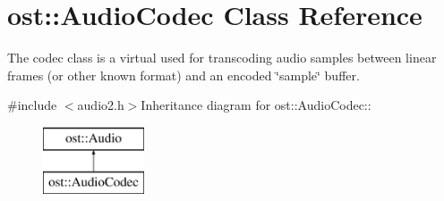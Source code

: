\section{ost::AudioCodec Class Reference}
\label{classost_1_1_audio_codec}


The codec class is a virtual used for transcoding audio samples between linear frames (or other known format) and an encoded \char`\"{}sample\char`\"{} buffer.  


{\ttfamily \#include $<$audio2.h$>$}Inheritance diagram for ost::AudioCodec::\begin{figure}[H]
\begin{center}
\leavevmode
\includegraphics[height=2cm]{classost_1_1_audio_codec}
\end{center}
\end{figure}
